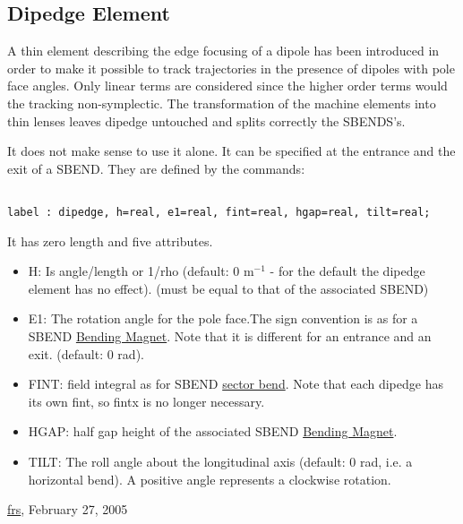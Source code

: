 



\subsection{Dipedge Element}

 A thin element describing the edge focusing of a dipole has been  introduced in order to make it possible to track trajectories in the  presence of dipoles with pole face angles. Only linear terms are considered since the higher order terms would the tracking non-symplectic. The transformation of the machine elements into thin lenses leaves dipedge untouched and splits correctly the SBENDS's. 

 It does not make sense to use it alone. It can be specified at the  entrance and the exit of a SBEND.  They are defined by the commands: 
\begin{verbatim}

label : dipedge, h=real, e1=real, fint=real, hgap=real, tilt=real;
\end{verbatim} It has zero length and five attributes. 
\begin{itemize}
	\item H: Is angle/length or 1/rho (default: 0 m$^{-1}$ - for the default the dipedge element has no effect). (must be equal to that of the associated SBEND) 
	\item E1: The rotation angle for the pole face.The sign convention is as for a SBEND \href{bend.html}{Bending Magnet}. Note that it is different for an entrance and an exit. (default: 0 rad). 
	\item FINT: field integral as for SBEND \href{local_system.html#sbend}{sector bend}. Note that each dipedge has its own fint, so fintx is no longer necessary. 
	\item HGAP: half gap height of the associated SBEND \href{bend.html}{Bending Magnet}.  


	\item TILT: The roll angle about the longitudinal axis (default: 0 rad, i.e. a horizontal bend). A positive angle represents a clockwise rotation. 
\end{itemize}

\href{http://www.cern.ch/Frank.Schmidt/frs_sign.html}{frs}, February 27, 2005  

